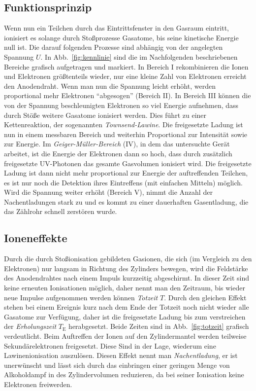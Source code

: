 \subsection{Funktionsprinzip}
Wenn nun ein Teilchen durch das Eintrittsfenster in den Gasraum eintritt, ionisiert es solange durch Stoßprozesse Gasatome, bis seine kinetische Energie null ist. Die darauf folgenden Prozesse sind abhängig von der angelegten Spannung $U$. In Abb.~\ref{fig:kennlinie} sind die im Nachfolgenden beschriebenen Bereiche grafisch aufgetragen und markiert. In Bereich I rekombinieren die Ionen und Elektronen größtenteils wieder, nur eine kleine Zahl von Elektronen erreicht den Anodendraht. Wenn man nun die Spannung leicht erhöht, werden proportional mehr Elektronen \enquote{abgesogen} (Bereich II). In Bereich III können die von der Spannung beschleunigten Elektronen so viel Energie aufnehmen, dass durch Stöße weitere Gasatome ionisiert werden. Dies führt zu einer Kettenreaktion, der sogenannten \emph{Townsend-Lawine}. Die freigesetzte Ladung ist nun in einem messbaren Bereich und weiterhin Proportional zur Intensität sowie zur Energie. Im \emph{Geiger-Müller-Bereich} (IV), in dem das untersuchte Gerät arbeitet, ist die Energie der Elektronen dann so hoch, dass durch zusätzlich freigesetzte UV-Photonen das gesamte Gasvolumen ionisiert wird. Die freigesetzte Ladung ist dann nicht mehr proportional zur Energie der auftreffenden Teilchen, es ist nur noch die Detektion ihres Eintreffens (mit einfachen Mitteln) möglich. Wird die Spannung weiter erhöht (Bereich V), nimmt die Anzahl der Nachentladungen stark zu und es kommt zu einer dauerhaften Gasentladung, die das Zählrohr schnell zerstören wurde.

\subsection{Ioneneffekte}
Durch die durch Stoßionisation gebildeten Gasionen, die sich (im Vergleich zu den Elektronen) nur langsam in Richtung des Zylinders bewegen, wird die Feldstärke des Anodendrahtes nach einem Impuls kurzzeitig abgeschirmt. In dieser Zeit sind keine erneuten Ionisationen möglich, daher nennt man den Zeitraum, bis wieder neue Impulse aufgenommen werden können \emph{Totzeit} $T$. Durch den gleichen Effekt stehen bei einem Ereignis kurz nach dem Ende der Totzeit noch nicht wieder alle Gasatome zur Verfügung, daher ist die freigesetzte Ladung bis zum verstreichen der \emph{Erholungszeit} $T_\text{E}$ herabgesetzt. Beide Zeiten sind in Abb.~\ref{fig:totzeit} grafisch verdeutlicht.
Beim Auftreffen der Ionen auf den Zylindermantel werden teilweise Sekundärelektronen freigesetzt. Diese Sind in der Lage, wiederum eine Lawinenionisation auszulösen. Diesen Effekt nennt man \emph{Nachentladung}, er ist unerwünscht und lässt sich durch das einbringen einer geringen Menge von Alkoholdampf in des Zylindervolumen reduzieren, da bei seiner Ionisation keine Elektronen freiwerden.

